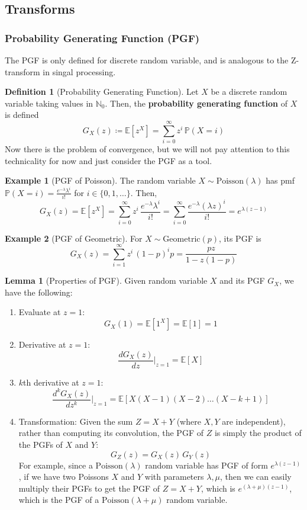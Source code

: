 \documentclass{article}
\theoremstyle{definition}
\newtheorem{lemma}[theorem]{Lemma}
\newtheorem{example}{Example}[section]
\theoremstyle{remark}
\theoremstyle{definition}
\newtheorem{definition}{Definition}[section]
\begin{document}
\subsection{Transforms}

\subsubsection{Probability Generating Function (PGF)}

The PGF is only defined for discrete random variable, and is analogous to the Z-transform in singal processing. 

\begin{definition}[Probability Generating Function]
Let $X$ be a discrete random variable taking values in $\mathbb{N}_0$. Then, the \textbf{probability generating function} of $X$ is defined 
\[G_X (z) \coloneqq \mathbb{E}[z^X] = \sum_{i=0}^\infty z^i \, \mathbb{P}(X = i)\]
Now there is the problem of convergence, but we will not pay attention to this technicality for now and just consider the PGF as a tool. 
\end{definition}

\begin{example}[PGF of Poisson]
The random variable $X \sim \mathrm{Poisson}(\lambda)$ has pmf $\mathbb{P}(X = i) = \frac{e^{-\lambda} \lambda^i}{i!}$ for $i \in \{0, 1, \ldots\}$. Then, 
\[G_X (z) = \mathbb{E}[z^X] = \sum_{i=0}^\infty z^i \, \frac{e^{-\lambda} \lambda^i}{i!} = \sum_{i=0}^\infty \frac{e^{-\lambda} (\lambda z)^i}{i!} = e^{\lambda(z - 1)}\]
\end{example}

\begin{example}[PGF of Geometric]
For $X \sim \mathrm{Geometric}(p)$, its PGF is 
\[G_X (z) = \sum_{i=1}^\infty z^i \, (1 - p)^i p = \frac{p z}{1 - z(1 - p)}\]
\end{example}

\begin{lemma}[Properties of PGF]
Given random variable $X$ and its PGF $G_X$, we have the following: 
\begin{enumerate}
    \item Evaluate at $z = 1$: 
    \[G_X (1) = \mathbb{E}[1^X] = \mathbb{E}[1] = 1\]
    \item Derivative at $z = 1$: 
    \[\frac{d G_X (z)}{d z} \bigg|_{z = 1} = \mathbb{E}[X]\]
    \item $k$th derivative at $z = 1$: 
    \[\frac{d^k G_X (z)}{d z^k} \bigg|_{z = 1} = \mathbb{E}[X (X-1) (X-2) \ldots (X-k +1)]\]
    \item Transformation: Given the sum $Z = X + Y$ (where $X, Y$ are independent), rather than computing its convolution, the PGF of $Z$ is simply the product of the PGFs of $X$ and $Y$: 
    \[G_Z (z) = G_X (z) \, G_Y (z)\]
    For example, since a $\mathrm{Poisson}(\lambda)$ random variable has PGF of form $e^{\lambda (z - 1)}$, if we have two Poissons $X$ and $Y$ with parameters $\lambda, \mu$, then we can easily multiply their PGFs to get the PGF of $Z = X + Y$, which is $e^{(\lambda + \mu)(z - 1)}$, which is the PGF of a $\mathrm{Poisson}(\lambda + \mu)$ random variable. 
\end{enumerate}
\end{lemma}
\end{document}
